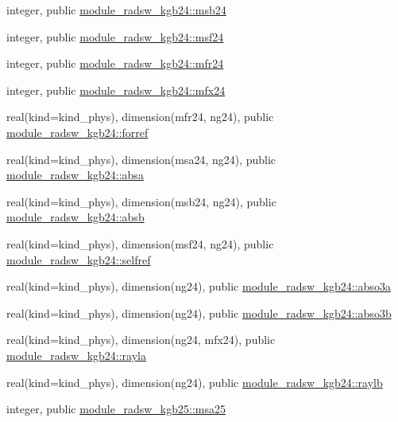 \begin{DoxyCompactItemize}
\item 
integer, public \hyperlink{namespacemodule__radsw__kgb24_a0ec09b4df9fbfa868844ad93a84cbe31}{module\+\_\+radsw\+\_\+kgb24\+::msb24}
\item 
integer, public \hyperlink{namespacemodule__radsw__kgb24_a52d0fde0af1d5427acf0d1924f393cdc}{module\+\_\+radsw\+\_\+kgb24\+::msf24}
\item 
integer, public \hyperlink{namespacemodule__radsw__kgb24_a3a1c3808493ce89f2218116a02350e51}{module\+\_\+radsw\+\_\+kgb24\+::mfr24}
\item 
integer, public \hyperlink{namespacemodule__radsw__kgb24_a6fcafb0e1605ad49a252ed1e22b00a5b}{module\+\_\+radsw\+\_\+kgb24\+::mfx24}
\item 
real(kind=kind\+\_\+phys), dimension(mfr24, ng24), public \hyperlink{namespacemodule__radsw__kgb24_ac57357ab300edcbad8f7b3801b796af3}{module\+\_\+radsw\+\_\+kgb24\+::forref}
\item 
real(kind=kind\+\_\+phys), dimension(msa24, ng24), public \hyperlink{namespacemodule__radsw__kgb24_a06965ec156c4e1d18d50a70ba43bd8e1}{module\+\_\+radsw\+\_\+kgb24\+::absa}
\item 
real(kind=kind\+\_\+phys), dimension(msb24, ng24), public \hyperlink{namespacemodule__radsw__kgb24_abd4db3c9678fee17f2cfd4a3e290619a}{module\+\_\+radsw\+\_\+kgb24\+::absb}
\item 
real(kind=kind\+\_\+phys), dimension(msf24, ng24), public \hyperlink{namespacemodule__radsw__kgb24_a784e78b5964fadd3e3e1f57f7af30802}{module\+\_\+radsw\+\_\+kgb24\+::selfref}
\item 
real(kind=kind\+\_\+phys), dimension(ng24), public \hyperlink{namespacemodule__radsw__kgb24_a3df78e9baa46df182aad6ff9b1662dc4}{module\+\_\+radsw\+\_\+kgb24\+::abso3a}
\item 
real(kind=kind\+\_\+phys), dimension(ng24), public \hyperlink{namespacemodule__radsw__kgb24_a6b44aa0637523aa1f78de5b4d16c693b}{module\+\_\+radsw\+\_\+kgb24\+::abso3b}
\item 
real(kind=kind\+\_\+phys), dimension(ng24, mfx24), public \hyperlink{namespacemodule__radsw__kgb24_ab24774576414b5d210c34916c3d19404}{module\+\_\+radsw\+\_\+kgb24\+::rayla}
\item 
real(kind=kind\+\_\+phys), dimension(ng24), public \hyperlink{namespacemodule__radsw__kgb24_a927fc4a43727d3e0735448c1cdc60458}{module\+\_\+radsw\+\_\+kgb24\+::raylb}
\item 
integer, public \hyperlink{namespacemodule__radsw__kgb25_afc06df1f3c3a0b2f3189424ed042973e}{module\+\_\+radsw\+\_\+kgb25\+::msa25}

\end{DoxyCompactItemize}
